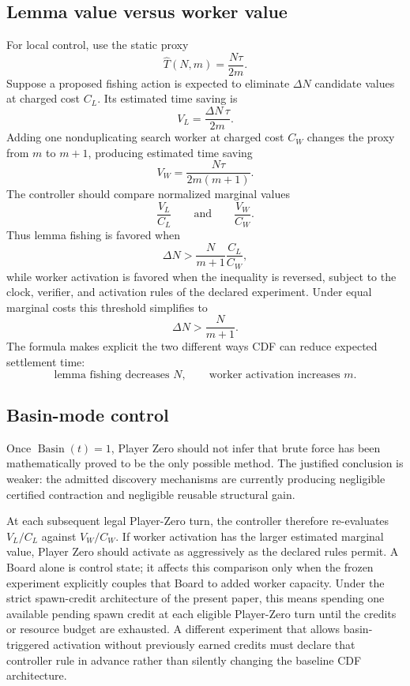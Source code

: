 \documentclass[11pt]{article}
\theoremstyle{definition}
\begin{document}
\subsection{Lemma value versus worker value}

For local control, use the static proxy
\[
\widehat T(N,m)=\frac{N\tau}{2m}.
\]
Suppose a proposed fishing action is expected to eliminate $\Delta N$ candidate values at charged cost $C_L$. Its estimated time saving is
\[
\boxed{
V_L
=
\frac{\Delta N\,\tau}{2m}.
}
\]
Adding one nonduplicating search worker at charged cost $C_W$ changes the proxy from $m$ to $m+1$, producing estimated time saving
\[
\boxed{
V_W
=
\frac{N\tau}{2m(m+1)}.
}
\]
The controller should compare normalized marginal values
\[
\frac{V_L}{C_L}
\qquad\text{and}\qquad
\frac{V_W}{C_W}.
\]
Thus lemma fishing is favored when
\[
\boxed{
\Delta N
>
\frac{N}{m+1}\frac{C_L}{C_W},
}
\]
while worker activation is favored when the inequality is reversed, subject to the clock, verifier, and activation rules of the declared experiment. Under equal marginal costs this threshold simplifies to
\[
\Delta N>\frac{N}{m+1}.
\]
The formula makes explicit the two different ways CDF can reduce expected settlement time:
\[
\boxed{
\text{lemma fishing decreases }N,
\qquad
\text{worker activation increases }m.
}
\]

\subsection{Basin-mode control}

Once $\operatorname{Basin}(t)=1$, Player Zero should not infer that brute force has been mathematically proved to be the only possible method. The justified conclusion is weaker: the admitted discovery mechanisms are currently producing negligible certified contraction and negligible reusable structural gain.

At each subsequent legal Player-Zero turn, the controller therefore re-evaluates $V_L/C_L$ against $V_W/C_W$. If worker activation has the larger estimated marginal value, Player Zero should activate as aggressively as the declared rules permit. A Board alone is control state; it affects this comparison only when the frozen experiment explicitly couples that Board to added worker capacity. Under the strict spawn-credit architecture of the present paper, this means spending one available pending spawn credit at each eligible Player-Zero turn until the credits or resource budget are exhausted. A different experiment that allows basin-triggered activation without previously earned credits must declare that controller rule in advance rather than silently changing the baseline CDF architecture.
\end{document}
